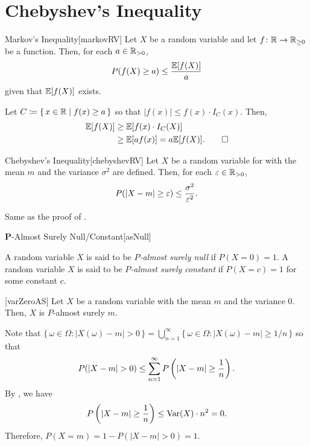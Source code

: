 \documentclass[../probability.tex]{subfiles}
\begin{document}
\section{Chebyshev's Inequality}

\begin{Theorem}{Markov's Inequality}[markovRV]
    Let \(X\) be a random variable and let \(f \colon \RR \to \RR_{\ge 0}\) be a function.
    Then, for each \(a \in \RR_{>0}\),
    \[
        P(f(X) \ge a) \le \frac{\mathbb{E}[f(X)]}{a}
    \]
    given that \(\mathbb{E}[f(X)]\) exists.
\end{Theorem}
\begin{myproof}[Proof]
    Let \(C \coloneqq \{\,x \in \RR \mid f(x) \ge a\,\}\)
    so that \(|f(x)| \le f(x) \cdot I_C(x)\).
    Then,
    \begin{align*}
        \mathbb{E}[f(X)]
        &\ge \mathbb{E}[f(x) \cdot I_C(X)] \\
        &\ge \mathbb{E}[af(x)] = a \mathbb{E}[f(X)]\text.\qedhere
    \end{align*}
\end{myproof}

\begin{Theorem}{Chebyshev's Inequality}[chebyshevRV]
    Let \(X\) be a random variable for with the mean \(m\) and the variance \(\sigma^2\)
    are defined. Then, for each \(\veps \in \RR_{>0}\),
    \[
        P(|X-m| \ge \varepsilon) \le \frac{\sigma^2}{\varepsilon^2}\text.
    \]
\end{Theorem}
\begin{myproof}[Proof]
    Same as the proof of .
\end{myproof}

\begin{Definition}{\(\bm{P}\)-Almost Surely Null/Constant}[asNull]
    \begin{itemize}
        \ii
        A random variable \(X\) is said to be \emph{\(P\)-almost surely null} if \(P(X = 0) = 1\).
        \ii
        A random variable \(X\) is said to be \emph{\(P\)-almost surely constant} if \(P(X = c) = 1\)
        for some constant \(c\).
    \end{itemize}
\end{Definition}

\begin{Lemma}{}[varZeroAS]
    Let \(X\) be a random variable with the mean \(m\) and the variance \(0\).
    Then, \(X\) is \(P\)-almost surely \(m\).
\end{Lemma}
\begin{myproof}[Proof]
    Note that \(\{\,\omega \in \Omega \colon |X(\omega) - m| > 0\,\} = \bigcup_{n=1}^\infty \{\,\omega
    \in \Omega \colon |X(\omega) - m| \ge 1/n\,\}\)
    so that
    \[
        P(|X - m| > 0) \le \sum_{n=1}^\infty P \left( |X - m| \ge \frac{1}{n} \right)\text.
    \]
    By , we have
    \[
        P\left(|X - m| \ge \frac{1}{n}\right)
        \le \operatorname{Var}(X) \cdot n^2 = 0\text.
    \]
    Therefore, \(P(X = m) = 1 - P(|X - m| > 0) = 1\).
\end{myproof}
\end{document}

